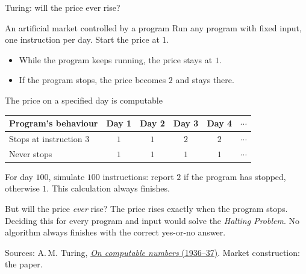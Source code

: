 \documentclass{beamer}
\newcommand{\doiref}[2]{%
  \href{https://doi.org/#1}{\textcolor{blue!65!black}{#2}}}
\newcommand{\sourcefoot}[1]{%
  \par\vfill{\fontsize{6.3}{7.5}\selectfont\color{black!65}Sources: #1\par}}
\begin{document}
\begin{frame}[shrink=4]{Turing: will the price ever rise?}
\small

\begin{block}{An artificial market controlled by a program}
Run any program with fixed input, one instruction per day. Start the price at $1$.
\begin{itemize}
\setlength{\itemsep}{0.2em}
\item While the program keeps running, the price stays at $1$.
\item If the program stops, the price becomes $2$ and stays there.
\end{itemize}
\end{block}

\begin{exampleblock}{The price on a specified day is computable}
\centering
\renewcommand{\arraystretch}{1.2}
\begin{tabular}{@{}lccccc@{}}
Program's behaviour & Day 1 & Day 2 & Day 3 & Day 4 & $\cdots$\\\hline
Stops at instruction 3 & $1$ & $1$ & $2$ & $2$ & $\cdots$\\
Never stops            & $1$ & $1$ & $1$ & $1$ & $\cdots$
\end{tabular}
\par\smallskip
\raggedright
For day $100$, simulate $100$ instructions: report $2$ if the program
has stopped, otherwise $1$. This calculation always finishes.
\end{exampleblock}

\begin{alertblock}{But will the price \emph{ever} rise?}
The price rises exactly when the program stops. Deciding this for every
program and input would solve the \emph{Halting Problem}.
No algorithm always finishes with the correct yes-or-no answer.
\end{alertblock}

\sourcefoot{A.\,M. Turing,
\doiref{10.1112/plms/s2-42.1.230}{\emph{On computable numbers} (1936--37)}.
Market construction: the paper.}
\end{frame}
\end{document}
